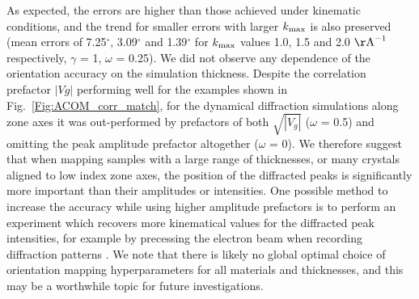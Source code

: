 \documentclass[%
 superscriptaddress,
 aip,
 amsmath,amssymb,
reprint,%
 author-year,%
longbibliography
]{revtex4-2}
\begin{document}
As expected, the errors are higher than those achieved under kinematic conditions, and the trend for smaller errors with larger $k_{\rm{max}}$ is also preserved (mean errors of 7.25$^\circ$, 3.09$^\circ$ and 1.39$^\circ$ for $k_{\rm{max}}$ values 1.0, 1.5 and 2.0 $\rm{\AA}^{-1}$ respectively, $\gamma $ = 1, $\omega$ = 0.25). We did not observe any dependence of the orientation accuracy on the simulation thickness. Despite the correlation prefactor $|Vg|$ performing well for the examples shown in Fig.~\ref{Fig:ACOM_corr_match}, for the dynamical diffraction simulations along zone axes it was out-performed by prefactors of both $\sqrt{|V_g|}$ ($\omega$ = 0.5) and omitting the peak amplitude prefactor altogether ($\omega$ = 0). We therefore suggest that when mapping samples with a large range of thicknesses, or many crystals aligned to low index zone axes, the position of the diffracted peaks is significantly more important than their amplitudes or intensities. One possible method to increase the accuracy while using higher amplitude prefactors is to perform an experiment which recovers more kinematical values for the diffracted peak intensities, for example by precessing the electron beam when recording diffraction patterns \citep{midgley2015precession, jeong2021automated}. We note that there is likely no global optimal choice of orientation mapping hyperparameters for all materials and thicknesses, and this may be a worthwhile topic for future investigations. 








\end{document}
